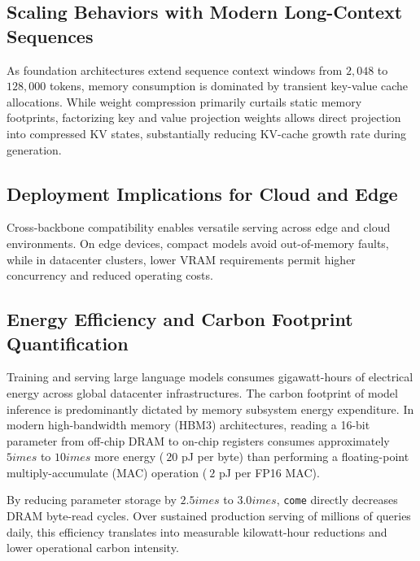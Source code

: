 \subsection{Scaling Behaviors with Modern Long-Context Sequences}
As foundation architectures extend sequence context windows from $2{,}048$ to $128{,}000$ tokens, memory consumption is dominated by transient key-value cache allocations. While weight compression primarily curtails static memory footprints, factorizing key and value projection weights allows direct projection into compressed KV states, substantially reducing KV-cache growth rate during generation.

\subsection{Deployment Implications for Cloud and Edge}
Cross-backbone compatibility enables versatile serving across edge and cloud environments. On edge devices, compact models avoid out-of-memory faults, while in datacenter clusters, lower VRAM requirements permit higher concurrency and reduced operating costs.

\subsection{Energy Efficiency and Carbon Footprint Quantification}
Training and serving large language models consumes gigawatt-hours of electrical energy across global datacenter infrastructures. The carbon footprint of model inference is predominantly dictated by memory subsystem energy expenditure. In modern high-bandwidth memory (HBM3) architectures, reading a 16-bit parameter from off-chip DRAM to on-chip registers consumes approximately $5	imes$ to $10	imes$ more energy ($~20$ pJ per byte) than performing a floating-point multiply-accumulate (MAC) operation ($~2$ pJ per FP16 MAC).

By reducing parameter storage by $2.5	imes$ to $3.0	imes$, \texttt{come} directly decreases DRAM byte-read cycles. Over sustained production serving of millions of queries daily, this efficiency translates into measurable kilowatt-hour reductions and lower operational carbon intensity.
